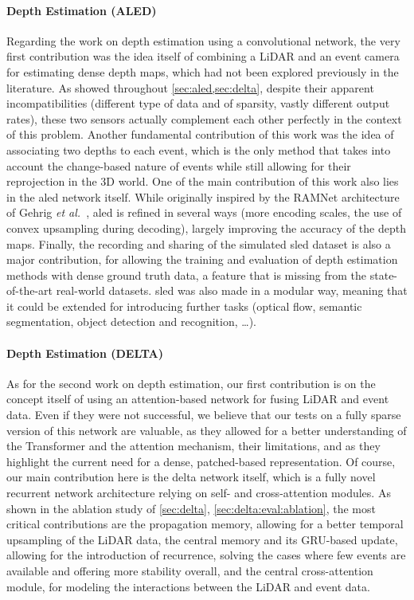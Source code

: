 \paragraph{Depth Estimation (ALED)}
Regarding the work on depth estimation using a convolutional network, the very first contribution was the idea itself of combining a LiDAR and an event camera for estimating dense depth maps, which had not been explored previously in the literature. As showed throughout \cref{sec:aled,sec:delta}, despite their apparent incompatibilities (different type of data and of sparsity, vastly different output rates), these two sensors actually complement each other perfectly in the context of this problem. Another fundamental contribution of this work was the idea of associating two depths to each event, which is the only method that takes into account the change-based nature of events while still allowing for their reprojection in the 3D world. One of the main contribution of this work also lies in the \acrshort{aled} network itself. While originally inspired by the RAMNet architecture of Gehrig \textit{et al.}~\cite{Gehrig2021CombiningEA}, \acrshort{aled} is refined in several ways (more encoding scales, the use of convex upsampling during decoding), largely improving the accuracy of the depth maps. Finally, the recording and sharing of the simulated \acrshort{sled} dataset is also a major contribution, for allowing the training and evaluation of depth estimation methods with dense ground truth data, a feature that is missing from the state-of-the-art real-world datasets. \acrshort{sled} was also made in a modular way, meaning that it could be extended for introducing further tasks (optical flow, semantic segmentation, object detection and recognition, \dots).

\paragraph{Depth Estimation (DELTA)}
As for the second work on depth estimation, our first contribution is on the concept itself of using an attention-based network for fusing LiDAR and event data. Even if they were not successful, we believe that our tests on a fully sparse version of this network are valuable, as they allowed for a better understanding of the Transformer and the attention mechanism, their limitations, and as they highlight the current need for a dense, patched-based representation. Of course, our main contribution here is the \acrshort{delta} network itself, which is a fully novel recurrent network architecture relying on self- and cross-attention modules. As shown in the ablation study of \cref{sec:delta}, \cref{sec:delta:eval:ablation}, the most critical contributions are the propagation memory, allowing for a better temporal upsampling of the LiDAR data, the central memory and its GRU-based update, allowing for the introduction of recurrence, solving the cases where few events are available and offering more stability overall, and the central cross-attention module, for modeling the interactions between the LiDAR and event data.

